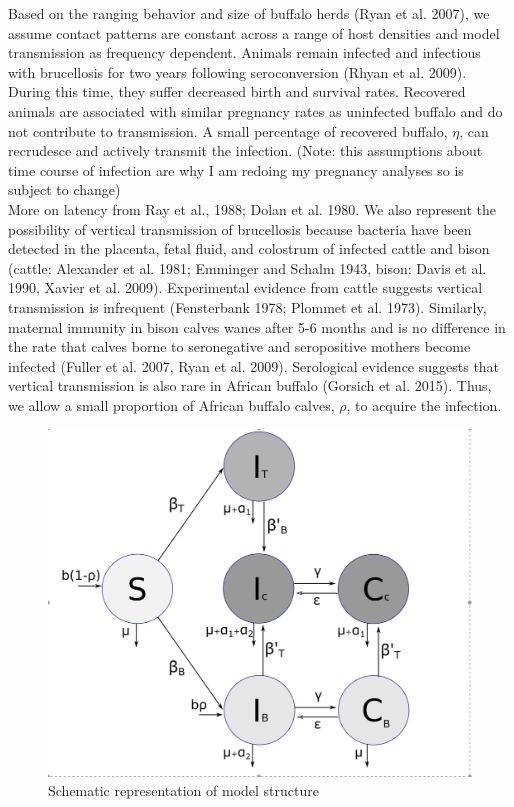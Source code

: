 \documentclass[letterpaper,12pt]{article}
\begin{document}
Based on the ranging behavior and size of buffalo herds (Ryan et al. 2007), we assume contact patterns are constant across a range of host densities and model transmission as frequency dependent.
Animals remain infected and infectious with brucellosis for two years following seroconversion (Rhyan et al. 2009).  
During this time, they suffer decreased birth and survival rates. 
Recovered animals are associated with similar pregnancy rates as uninfected buffalo and do not contribute to transmission. %
A small percentage of recovered buffalo, $\eta$, can recrudesce and actively transmit the infection. (Note: this assumptions about time course of infection are why I am redoing my pregnancy analyses so is subject to change) \\
More on latency from Ray et al., 1988; Dolan et al. 1980. 
We also represent the possibility of vertical transmission of brucellosis because bacteria have been detected in the placenta, fetal fluid, and colostrum of infected cattle and bison (cattle: Alexander et al. 1981; Emminger and Schalm 1943, bison: Davis et al. 1990, Xavier et al. 2009).
Experimental evidence from cattle suggests vertical transmission is infrequent (Fensterbank 1978; Plommet et al. 1973).  
Similarly, maternal immunity in bison calves wanes after 5-6 months and is no difference in the rate that calves borne to seronegative and seropositive mothers become infected (Fuller et al. 2007, Ryan et al. 2009).
Serological evidence suggests that vertical transmission is also rare in African buffalo (Gorsich et al. 2015).
Thus, we allow a small proportion of African buffalo calves, $\rho$, to acquire the infection. \\%


\begin{figure}
\begin{center}
\includegraphics[width=4.5in]{Figure2_modelstructure}
\end{center}
\caption{Schematic representation of model structure}
\label{fig2}
\end{figure}
\end{document}
